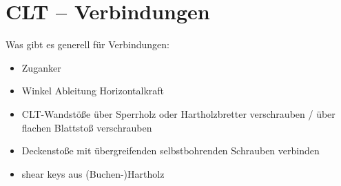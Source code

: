 \documentclass[fleqn,twoside]{article}
\begin{document}
\section{CLT – Verbindungen}

Was gibt es generell für Verbindungen:
    \begin{itemize}
        \item Zuganker
        \item Winkel Ableitung Horizontalkraft
        \item CLT-Wandstöße über Sperrholz oder Hartholzbretter verschrauben / über flachen Blattstoß verschrauben
        \item Deckenstoße mit übergreifenden selbstbohrenden Schrauben verbinden 
        \item shear keys aus (Buchen-)Hartholz
    \end{itemize}
\end{document}
